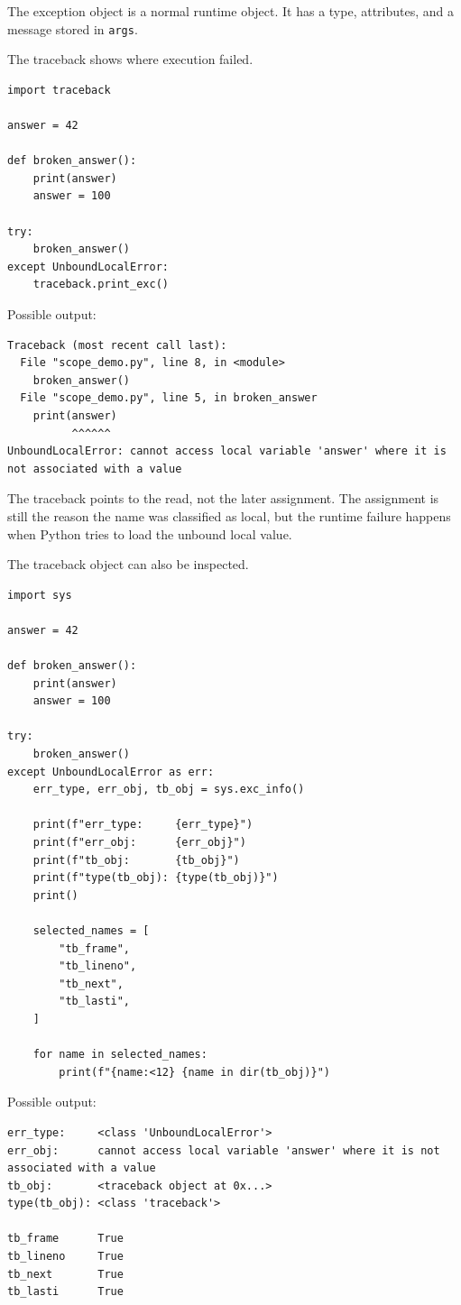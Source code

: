 The exception object is a normal runtime object. It has a type, attributes, and a message stored in \texttt{args}.

The traceback shows where execution failed.

\begin{verbatim}
import traceback

answer = 42

def broken_answer():
    print(answer)
    answer = 100

try:
    broken_answer()
except UnboundLocalError:
    traceback.print_exc()
\end{verbatim}

Possible output:

\begin{verbatim}
Traceback (most recent call last):
  File "scope_demo.py", line 8, in <module>
    broken_answer()
  File "scope_demo.py", line 5, in broken_answer
    print(answer)
          ^^^^^^
UnboundLocalError: cannot access local variable 'answer' where it is not associated with a value
\end{verbatim}

The traceback points to the read, not the later assignment. The assignment is still the reason the name was classified as local, but the runtime failure happens when Python tries to load the unbound local value.

The traceback object can also be inspected.

\begin{verbatim}
import sys

answer = 42

def broken_answer():
    print(answer)
    answer = 100

try:
    broken_answer()
except UnboundLocalError as err:
    err_type, err_obj, tb_obj = sys.exc_info()

    print(f"err_type:     {err_type}")
    print(f"err_obj:      {err_obj}")
    print(f"tb_obj:       {tb_obj}")
    print(f"type(tb_obj): {type(tb_obj)}")
    print()

    selected_names = [
        "tb_frame",
        "tb_lineno",
        "tb_next",
        "tb_lasti",
    ]

    for name in selected_names:
        print(f"{name:<12} {name in dir(tb_obj)}")
\end{verbatim}

Possible output:

\begin{verbatim}
err_type:     <class 'UnboundLocalError'>
err_obj:      cannot access local variable 'answer' where it is not associated with a value
tb_obj:       <traceback object at 0x...>
type(tb_obj): <class 'traceback'>

tb_frame      True
tb_lineno     True
tb_next       True
tb_lasti      True
\end{verbatim}

